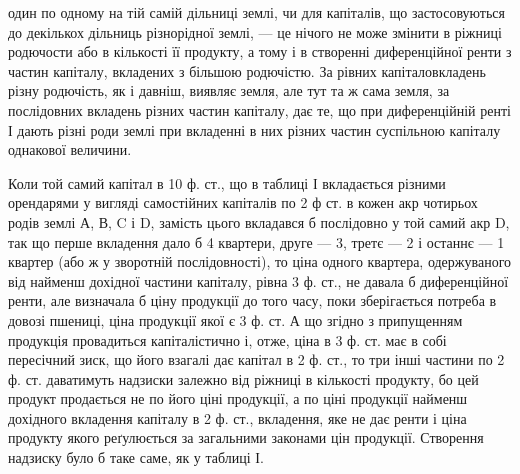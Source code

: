 \parcont{}  %
один по одному на тій самій дільниці землі, чи для капіталів, що застосовуються
до декількох дільниць різнорідної землі, — це нічого не може змінити в ріжниці
родючости або в кількості її продукту, а тому і в створенні диференційної
ренти з частин капіталу, вкладених з більшою родючістю. За рівних капіталовкладень
різну родючість, як і давніш, виявляє земля, але тут та ж сама земля,
за послідовних вкладень різних частин капіталу, дає те, що при диференційній
ренті І дають різні роди землі при вкладенні в них різних частин суспільною
капіталу однакової величини.

Коли той самий капітал в 10 ф. ст., що в таблиці І вкладається різними орендарями
у вигляді самостійних капіталів по 2 ф ст. в кожен акр чотирьох родів
землі А, В, C і D, замість цього вкладався б послідовно у той самий акр
D, так що перше вкладення дало б 4 квартери, друге — 3, третє — 2 і останнє
— 1 квартер (або ж у зворотній послідовності), то ціна одного квартера, одержуваного
від найменш дохідної частини капіталу, рівна 3 ф. ст., не давала б диференційної
ренти, але визначала б ціну продукції до того часу, поки зберігається
потреба в довозі пшениці, ціна продукції якої є 3 ф. ст. А що згідно з припущенням
продукція провадиться капіталістично і, отже, ціна в 3 ф. ст. має
в собі пересічний зиск, що його взагалі дає капітал в 2 ф. ст., то три інші
частини по 2 ф. ст. даватимуть надзиски залежно від ріжниці в кількості
продукту, бо цей продукт продається не по його ціні продукції, а по ціні продукції
найменш дохідного вкладення капіталу в 2 ф. ст., вкладення, яке не дає ренти
і ціна продукту якого реґулюється за загальними законами цін продукції. Створення
надзиску було б таке саме, як у таблиці І.

